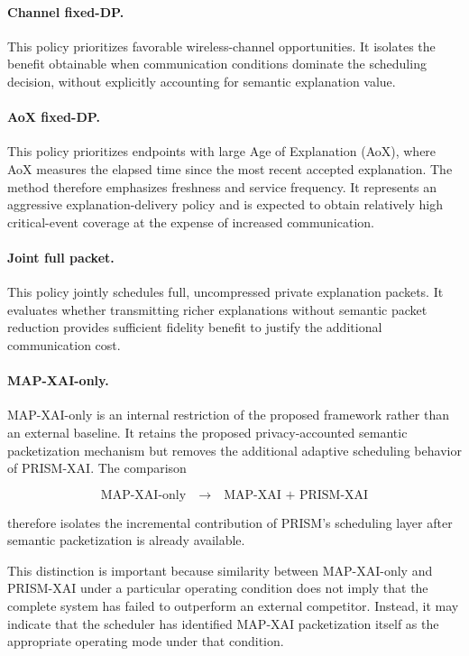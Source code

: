 \documentclass[11pt]{article}
\begin{document}
\paragraph{Channel fixed-DP.}
This policy prioritizes favorable wireless-channel opportunities. It isolates the benefit obtainable when communication conditions dominate the scheduling decision, without explicitly accounting for semantic explanation value.

\paragraph{AoX fixed-DP.}
This policy prioritizes endpoints with large Age of Explanation (AoX), where AoX measures the elapsed time since the most recent accepted explanation. The method therefore emphasizes freshness and service frequency. It represents an aggressive explanation-delivery policy and is expected to obtain relatively high critical-event coverage at the expense of increased communication.

\paragraph{Joint full packet.}
This policy jointly schedules full, uncompressed private explanation packets. It evaluates whether transmitting richer explanations without semantic packet reduction provides sufficient fidelity benefit to justify the additional communication cost.

\paragraph{MAP-XAI-only.}
MAP-XAI-only is an internal restriction of the proposed framework rather than an external baseline. It retains the proposed privacy-accounted semantic packetization mechanism but removes the additional adaptive scheduling behavior of PRISM-XAI. The comparison

$$
\text{MAP-XAI-only}
\quad\longrightarrow\quad
\text{MAP-XAI + PRISM-XAI}
$$

therefore isolates the incremental contribution of PRISM's scheduling layer after semantic packetization is already available.

This distinction is important because similarity between MAP-XAI-only and PRISM-XAI under a particular operating condition does not imply that the complete system has failed to outperform an external competitor. Instead, it may indicate that the scheduler has identified MAP-XAI packetization itself as the appropriate operating mode under that condition.
\end{document}

